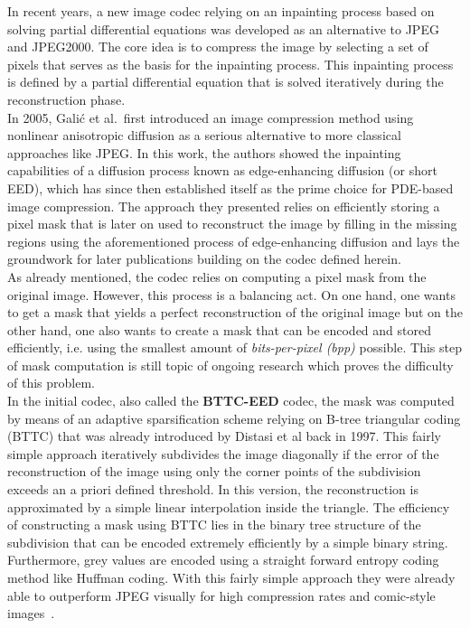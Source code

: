 In recent years, a new image codec relying on an inpainting process based on solving partial
differential equations was developed as an
alternative to JPEG and JPEG2000. The core idea is to compress the image by selecting a set of
pixels that serves as the basis for the inpainting process. This inpainting process is defined by a
partial differential equation that is solved iteratively during the reconstruction phase.\\
In 2005, Galić et al.\cite{galic05}\ first introduced an image compression method using nonlinear
anisotropic diffusion
 as a serious alternative to more classical approaches like JPEG. In this
work, the authors showed the inpainting capabilities of a diffusion process known as edge-enhancing
diffusion (or short EED), which has since then established itself as the prime choice for PDE-based image
compression. The approach they presented relies on efficiently storing a pixel mask that is later
on used to reconstruct the image by filling in the missing regions using the aforementioned process
of edge-enhancing diffusion and lays the groundwork for later publications building on the codec
defined herein. \\
As already mentioned, the codec relies on computing a pixel mask from the original image. However,
this process is a balancing act. On one hand, one wants to get a mask that yields a perfect
reconstruction of the original image but on the other hand, one also wants to create a mask that
can be encoded and stored efficiently, i.e. using the smallest amount of \textit{bits-per-pixel
(bpp)} possible. This step of mask computation is still topic of ongoing research which proves the
difficulty of this problem.\\
In the initial codec, also called the \textbf{BTTC-EED} codec, the mask was
computed by means of an adaptive sparsification scheme relying on B-tree triangular coding (BTTC)
that was already introduced by Distasi et al\cite{distasi97} back in 1997. This fairly simple
approach iteratively subdivides the image diagonally if the error of the reconstruction of the image using only
the corner points of the subdivision exceeds an a priori defined threshold. In this version, the
reconstruction is approximated by a simple linear interpolation inside the triangle. The efficiency
of constructing a mask using BTTC lies in the binary tree structure of the subdivision that can be encoded extremely
efficiently by a simple binary string. Furthermore, grey values are encoded using a straight
forward entropy
coding method like Huffman coding\cite{huffman}.
With this fairly simple approach they were already able to outperform JPEG visually for high
compression rates and comic-style images~\cite{galic05}.\\

